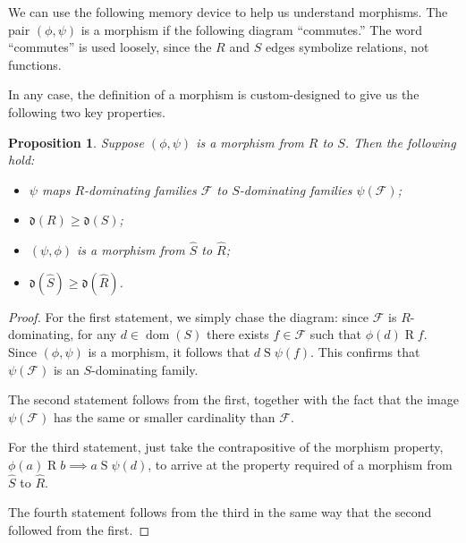 \documentclass[11pt,oneside]{amsbook}
\DeclareMathOperator{\dom}{dom}
\DeclareMathOperator{\cod}{cod}
\theoremstyle{definition}
\theoremstyle{plain}
\newtheorem{proposition}[theorem]{Proposition}
\theoremstyle{definition}
\theoremstyle{remark}
\numberwithin{equation}{section}
\numberwithin{figure}{section}
\begin{document}
We can use the following memory device to help us understand morphisms. The pair $(\phi,\psi)$ is a morphism if the following diagram ``commutes.'' The word ``commutes'' is used loosely, since the $R$ and $S$ edges symbolize relations, not functions.
\begin{center}
\end{center}
In any case, the definition of a morphism is custom-designed to give us the following two key properties.

\begin{proposition}
  \label{prop:morphism}
  Suppose $(\phi,\psi)$ is a morphism from $R$ to $S$. Then the following hold:
  \begin{itemize}
    \item $\psi$ maps $R$-dominating families $\mathcal F$ to $S$-dominating families $\psi(\mathcal F)$;
    \item $\mathfrak d(R)\geq\mathfrak d(S)$;
    \item $(\psi,\phi)$ is a morphism from $\hat S$ to $\hat R$;
    \item $\mathfrak d(\hat S)\geq\mathfrak d(\hat R)$.
  \end{itemize}
\end{proposition}

\begin{proof}
  For the first statement, we simply chase the diagram: since $\mathcal F$ is $R$-dominating, for any $d\in\dom(S)$ there exists $f\in\mathcal F$ such that $\phi(d)\mathrel{R}f$. Since $(\phi,\psi)$ is a morphism, it follows that $d\mathrel{S}\psi(f)$. This confirms that $\psi(\mathcal F)$ is an $S$-dominating family.
  
  The second statement follows from the first, together with the fact that the image $\psi(\mathcal F)$ has the same or smaller cardinality than $\mathcal F$.

  For the third statement, just take the contrapositive of the morphism property, $\phi(a)\mathrel R b\implies a\mathrel S\psi(d)$, to arrive at the property required of a morphism from $\hat S$ to $\hat R$.
  
  The fourth statement follows from the third in the same way that the second followed from the first.
\end{proof}
\end{document}

